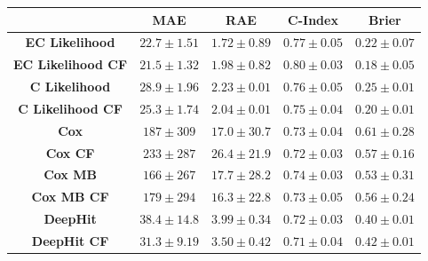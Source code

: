\documentclass[portrait, color=UCLburgundy, margin=1cm]{uclposter}
\begin{document}
\begin{multicols}{2}
\begin{table}[H]
            \resizebox*{1.0\linewidth}{!}
            {
                \begin{tabular}{||c|cc|c|c||}
                    \hline
                                                & \textbf{\gls{MAE}}    & \textbf{\gls{RAE}}    & \textbf{C-Index}  & \textbf{Brier}    \\
                    \hline
                    \textbf{EC Likelihood}      & $22.7\pm1.51$         & $1.72\pm0.89$         & $0.77\pm0.05$     & $0.22\pm0.07$     \\
                    \textbf{EC Likelihood CF}   & $21.5\pm1.32$         & $1.98\pm0.82$         & $0.80\pm0.03$     & $0.18\pm0.05$     \\
                    \textbf{C Likelihood}       & $28.9\pm1.96$         & $2.23\pm0.01$         & $0.76\pm0.05$     & $0.25\pm0.01$     \\
                    \textbf{C Likelihood CF}    & $25.3\pm1.74$         & $2.04\pm0.01$         & $0.75\pm0.04$     & $0.20\pm0.01$     \\
                    \hline
                    \textbf{Cox}                & $187 \pm309 $         & $17.0\pm30.7$         & $0.73\pm0.04$     & $0.61\pm0.28$     \\
                    \textbf{Cox CF}             & $233 \pm287 $         & $26.4\pm21.9$         & $0.72\pm0.03$     & $0.57\pm0.16$     \\
                    \textbf{Cox \gls{MB}}       & $166 \pm267 $         & $17.7\pm28.2$         & $0.74\pm0.03$     & $0.53\pm0.31$     \\
                    \textbf{Cox \gls{MB} CF}    & $179 \pm294 $         & $16.3\pm22.8$         & $0.73\pm0.05$     & $0.56\pm0.24$     \\
                    \hline
                    \textbf{DeepHit}            & $38.4\pm14.8$         & $3.99\pm0.34$         & $0.72\pm0.03$     & $0.40\pm0.01$     \\
                    \textbf{DeepHit CF}         & $31.3\pm9.19$         & $3.50\pm0.42$         & $0.71\pm0.04$     & $0.42\pm0.01$     \\
                    \hline
                \end{tabular}
            }
        \end{table}
    \end{multicols}
\end{document}
